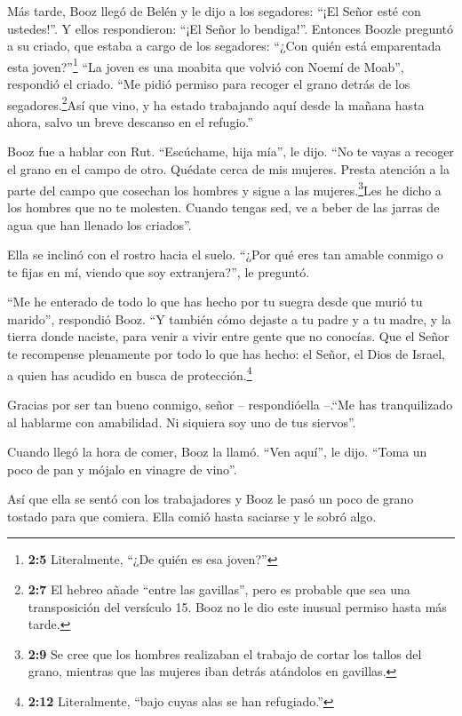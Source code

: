  Más tarde, Booz llegó de Belén y le dijo a los segadores:
``¡El Señor esté con ustedes!''. Y ellos respondieron: ``¡El Señor lo
bendiga!''.  Entonces Boozle preguntó a su criado, que
estaba a cargo de los segadores: ``¿Con quién está emparentada esta
joven?''\footnote{\textbf{2:5} Literalmente, ``¿De quién es esa joven?''}
 ``La joven es una moabita que volvió con Noemí de Moab'',
respondió el criado.  ``Me pidió permiso para recoger el
grano detrás de los segadores.\footnote{\textbf{2:7} El hebreo añade
  ``entre las gavillas'', pero es probable que sea una transposición del
  versículo 15. Booz no le dio este inusual permiso hasta más tarde.}Así
que vino, y ha estado trabajando aquí desde la mañana hasta ahora, salvo
un breve descanso en el refugio.''

 Booz fue a hablar con Rut. ``Escúchame, hija mía'', le
dijo. ``No te vayas a recoger el grano en el campo de otro. Quédate
cerca de mis mujeres.  Presta atención a la parte del campo
que cosechan los hombres y sigue a las mujeres.\footnote{\textbf{2:9} Se
  cree que los hombres realizaban el trabajo de cortar los tallos del
  grano, mientras que las mujeres iban detrás atándolos en gavillas.}Les
he dicho a los hombres que no te molesten. Cuando tengas sed, ve a beber
de las jarras de agua que han llenado los criados''.

 Ella se inclinó con el rostro hacia el suelo. ``¿Por qué
eres tan amable conmigo o te fijas en mí, viendo que soy extranjera?'',
le preguntó.

 ``Me he enterado de todo lo que has hecho por tu suegra
desde que murió tu marido'', respondió Booz. ``Y también cómo dejaste a
tu padre y a tu madre, y la tierra donde naciste, para venir a vivir
entre gente que no conocías.  Que el Señor te recompense
plenamente por todo lo que has hecho: el Señor, el Dios de Israel, a
quien has acudido en busca de protección.\footnote{\textbf{2:12}
  Literalmente, ``bajo cuyas alas se han refugiado.''}

 Gracias por ser tan bueno conmigo, señor -- respondióella
--.``Me has tranquilizado al hablarme con amabilidad. Ni siquiera soy
uno de tus siervos''.

 Cuando llegó la hora de comer, Booz la llamó. ``Ven
aquí'', le dijo. ``Toma un poco de pan y mójalo en vinagre de vino''.

Así que ella se sentó con los trabajadores y Booz le pasó un poco de
grano tostado para que comiera. Ella comió hasta saciarse y le sobró
algo.


